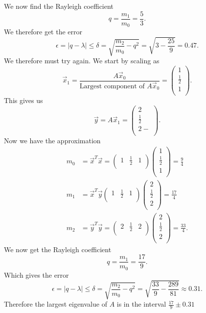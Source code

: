 We now find the Rayleigh coefficient
\[ 
q = \frac{m_1}{m_0} = \frac{5}{3}
.\]
We therefore get the error
\[ 
\epsilon = |q - \lambda| \leq \delta = \sqrt{\frac{m_2}{m_0} - q^2} = \sqrt{3 - \frac{25}{9}} = \num{0,47} 
.\]
We therefore must try again. We start by scaling as
\[ 
\Vec{x}_1 = \frac{A \Vec{x}_0}{\text{Largest component of } A \Vec{x}_0} = \begin{pmatrix}
1\\
\frac{1}{2}\\
1\\
\end{pmatrix}
.\]
This gives us
\[ 
\Vec{y} = A \Vec{x}_1 = \begin{pmatrix}
2\\
\frac{1}{2}\\
2-\\
\end{pmatrix}
.\]
Now we have the approximation
\begin{align*}
  m_0 &= \Vec{x}^{T} \Vec{x} = \begin{pmatrix}
  1 & \frac{1}{2} & 1\\
  \end{pmatrix} \begin{pmatrix}
  1\\
  \frac{1}{2}\\
  1\\
  \end{pmatrix} = \frac{9}{4} \\
  m_1 &= \Vec{x}^{T} \Vec{y} \begin{pmatrix}
  1 & \frac{1}{2} & 1\\
  \end{pmatrix} \begin{pmatrix}
  2\\
  \frac{1}{2}\\
  2\\
  \end{pmatrix} = \frac{17}{4} \\
    m_2 &= \Vec{y}^{T} \Vec{y} = \begin{pmatrix}
    2 & \frac{1}{2} & 2\\
    \end{pmatrix} \begin{pmatrix}
    2\\
    \frac{1}{2}\\
    2\\
    \end{pmatrix} = \frac{33}{4}
.\end{align*}
We now get the Rayleigh coefficient
\[ 
q = \frac{m_1}{m_0} = \frac{17}{9}
.\]
Which gives the error
\[ 
\epsilon = \left| q - \lambda \right| \leq \delta = \sqrt{\frac{m_2}{m_0} - q^2} = \sqrt{\frac{33}{9} - \frac{289}{81}} \approx \num{0,31} 
.\]
Therefore the largest eigenvalue of $A$ is in the interval $\frac{17}{9} \pm \num{0,31} $


